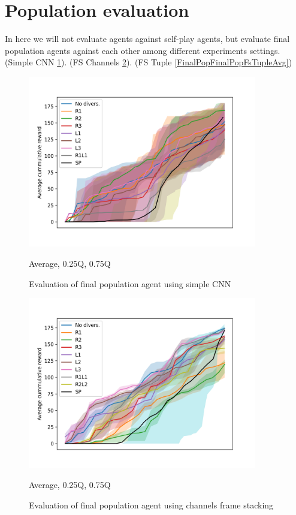 \section{Population evaluation}
In here we will not evaluate agents against self-play agents, but evaluate final population agents against each other among different experiments settings.
(Simple CNN \ref{FinalPopFinalPopSimpleCnnAvg}). (FS Channels \ref{FinalPopFinalPopFsChannelsAvg}). (FS Tuple \ref{FinalPopFinalPopFsTupleAvg})
\begin{figure}[!ht]
    \centering
    \includegraphics*[width=10cm]{../img/FinalPopFinalPopSimpleCnnAvg.png}

    \caption{Evaluation of final population agent using simple CNN}
    \label{FinalPopFinalPopSimpleCnnAvg}
    \medskip
    \small 

    Average, 0.25Q, 0.75Q

\end{figure}

\begin{figure}[!ht]
    \centering
    \includegraphics*[width=10cm]{../img/FinalPopFinalPopFsChannelsAvg.png}

    \caption{Evaluation of final population agent using channels frame stacking}
    \label{FinalPopFinalPopFsChannelsAvg}
    \medskip
    \small 

    Average, 0.25Q, 0.75Q

\end{figure}

